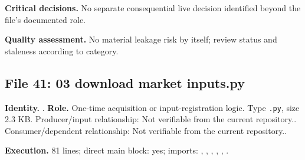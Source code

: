 \documentclass[
  11pt,
  a4paper]{article}
\begin{document}
\textbf{Critical decisions.} No separate consequential live decision
identified beyond the file's documented role.

\textbf{Quality assessment.} No material leakage risk by itself; review
status and staleness according to category.

\subsection{File 41: 03 download market
inputs.py}\label{file-4988229420030479700}

\textbf{Identity.} .
\textbf{Role.} One-time acquisition or input-registration logic. Type
\texttt{.py}, size 2.3 KB. Producer/input relationship: Not verifiable
from the current repository.. Consumer/dependent relationship: Not
verifiable from the current repository..

\textbf{Execution.} 81 lines; direct main block: yes; imports:
, ,
,
,
, .
\end{document}
